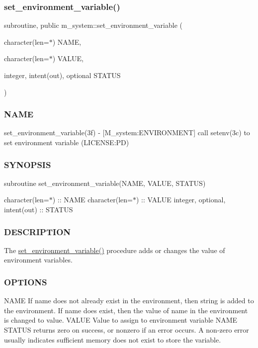\subsubsection{\texorpdfstring{set\+\_\+environment\+\_\+variable()}{set\_environment\_variable()}}
{\footnotesize\ttfamily subroutine, public m\+\_\+system\+::set\+\_\+environment\+\_\+variable (\begin{DoxyParamCaption}\item[{character(len=$\ast$)}]{N\+A\+ME,  }\item[{character(len=$\ast$)}]{V\+A\+L\+UE,  }\item[{integer, intent(out), optional}]{S\+T\+A\+T\+US }\end{DoxyParamCaption})}



\subsubsection*{N\+A\+ME}

set\+\_\+environment\+\_\+variable(3f) -\/ \mbox{[}M\+\_\+system\+:E\+N\+V\+I\+R\+O\+N\+M\+E\+NT\mbox{]} call setenv(3c) to set environment variable (L\+I\+C\+E\+N\+SE\+:PD) 

\subsubsection*{S\+Y\+N\+O\+P\+S\+IS}

subroutine set\+\_\+environment\+\_\+variable(\+N\+A\+M\+E, V\+A\+L\+U\+E, S\+T\+A\+T\+U\+S)

character(len=$\ast$) \+:\+: N\+A\+ME character(len=$\ast$) \+:\+: V\+A\+L\+UE integer, optional, intent(out) \+:\+: S\+T\+A\+T\+US

\subsubsection*{D\+E\+S\+C\+R\+I\+P\+T\+I\+ON}

The \mbox{\hyperlink{namespacem__system_ad813765403a5d9d6fb7a2edcb669fe4b}{set\+\_\+environment\+\_\+variable()}} procedure adds or changes the value of environment variables.

\subsubsection*{O\+P\+T\+I\+O\+NS}

N\+A\+ME If name does not already exist in the environment, then string is added to the environment. If name does exist, then the value of name in the environment is changed to value. V\+A\+L\+UE Value to assign to environment variable N\+A\+ME S\+T\+A\+T\+US returns zero on success, or nonzero if an error occurs. A non-\/zero error usually indicates sufficient memory does not exist to store the variable.

